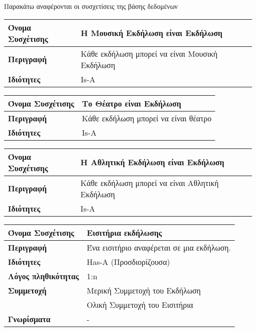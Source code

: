 Παρακάτω αναφέρονται οι συσχετίσεις της βάσης δεδομένων \titlos
\begin{center}
\begin{tabular}[]{|p{4cm}|p{10cm}|}
  \hline
  \textbf{Όνομα Συσχέτισης} & Η Μουσική Εκδήλωση είναι Εκδήλωση\\ \hline
  \textbf{Περιγραφή} & Κάθε εκδήλωση μπορεί να είναι Μουσική Εκδήλωση\\ \hline
  \textbf{Ιδιότητες} & Is-A  \\ \hline
\end{tabular}
\vspace{0.3 cm}

\begin{tabular}[]{|p{4cm}|p{10cm}|}
  \hline
  \textbf{Όνομα Συσχέτισης} & Το Θέατρο είναι Εκδήλωση\\ \hline
  \textbf{Περιγραφή} & Κάθε εκδήλωση μπορεί να είναι θέατρο\\ \hline
  \textbf{Ιδιότητες} & Is-A  \\ \hline
\end{tabular}
\vspace{0.3 cm}

\begin{tabular}[]{|p{4cm}|p{10cm}|}
  \hline
  \textbf{Όνομα Συσχέτισης} & Η Αθλητική Εκδήλωση είναι Εκδήλωση\\ \hline
  \textbf{Περιγραφή} & Κάθε εκδήλωση μπορεί να είναι Αθλητική Εκδήλωση\\ \hline
  \textbf{Ιδιότητες} & Is-A  \\ \hline
\end{tabular}
\vspace{0.3 cm}


\begin{tabular}[]{|p{4cm}|p{10cm}|}
  \hline
  \textbf{Όνομα Συσχέτισης}   & Εισιτήρια εκδήλωσης                       \\ \hline
  \textbf{Περιγραφή}          & Ένα εισιτήριο αναφέρεται σε μια εκδήλωση. \\ \hline
  \textbf{Ιδιότητες}          & Has-A (Προσδιορίζουσα)                    \\ \hline
  \textbf{Λόγος πληθικότητας} & 1:n                                       \\ \hline
  \textbf{Συμμετοχή}          & Μερική Συμμετοχή του Εκδήλωση             \\ \cline{2-2}
                              & Ολική Συμμετοχή του Εισιτήρια             \\ \hline
  \textbf{Γνωρίσματα}         & -                                         \\ \hline
\end{tabular}
\vspace{0.3 cm}


\end{center}
